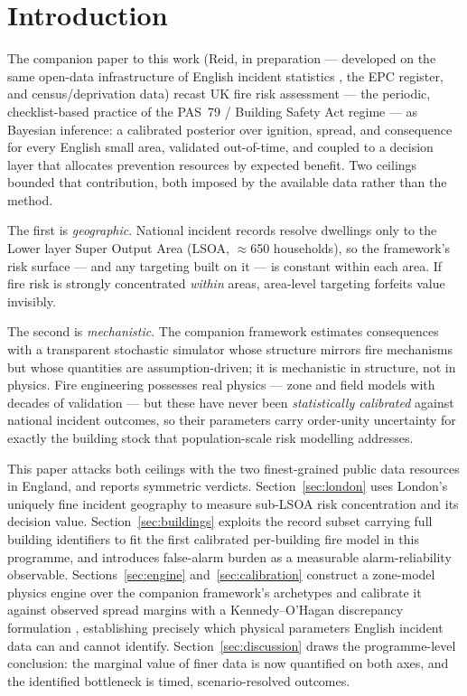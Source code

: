 \documentclass[11pt]{article}
\begin{document}
\section{Introduction}
\label{sec:intro}

The companion paper to this work (Reid, in preparation --- developed on the
same open-data infrastructure of English incident statistics
\citep{mhclg2026firestats}, the EPC register, and census/deprivation data)
recast UK fire risk assessment --- the periodic, checklist-based practice of
the PAS~79 / Building Safety Act regime \citep{pas79_1_2020,bsa2022} --- as
Bayesian inference: a calibrated posterior over ignition, spread, and
consequence for every English small area, validated out-of-time, and coupled to
a decision layer that allocates prevention resources by expected benefit. Two
ceilings bounded that contribution, both imposed by the available data rather
than the method.

The first is \emph{geographic}. National incident records resolve dwellings
only to the Lower layer Super Output Area (LSOA, $\approx$650 households), so
the framework's risk surface --- and any targeting built on it --- is constant
within each area. If fire risk is strongly concentrated \emph{within} areas,
area-level targeting forfeits value invisibly.

The second is \emph{mechanistic}. The companion framework estimates
consequences with a transparent stochastic simulator whose structure mirrors
fire mechanisms but whose quantities are assumption-driven; it is
mechanistic in structure, not in physics. Fire engineering possesses real physics ---
zone and field models with decades of validation --- but these have never been
\emph{statistically calibrated} against national incident outcomes, so their
parameters carry order-unity uncertainty for exactly the building stock that
population-scale risk modelling addresses.

This paper attacks both ceilings with the two finest-grained public data
resources in England, and reports symmetric verdicts. Section~\ref{sec:london}
uses London's uniquely fine incident geography to measure sub-LSOA risk
concentration and its decision value. Section~\ref{sec:buildings} exploits the
record subset carrying full building identifiers to fit the first calibrated
per-building fire model in this programme, and introduces false-alarm burden as
a measurable alarm-reliability observable. Sections~\ref{sec:engine}
and~\ref{sec:calibration} construct a zone-model physics engine over the
companion framework's archetypes and calibrate it against observed spread
margins with a Kennedy--O'Hagan discrepancy formulation \citep{kennedy2001},
establishing precisely which physical parameters English incident data can and
cannot identify. Section~\ref{sec:discussion} draws the programme-level
conclusion: the marginal value of finer data is now quantified on both axes,
and the identified bottleneck is timed, scenario-resolved outcomes.
\end{document}
